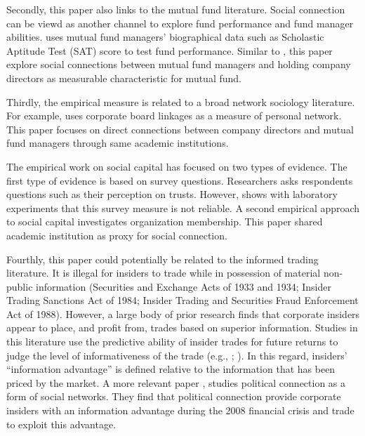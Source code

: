 \documentclass[11pt]{article}
\begin{document}
\begin{doublespace}
Secondly, this paper also links to the mutual fund literature. Social connection can be viewd as another channel to explore fund performance and fund manager abilities. \cite{chevalier1999some} uses mutual fund managers' biographical data such as Scholastic Aptitude Test (SAT) score to test fund performance. Similar to \cite{cohen2008small}, this paper explore social connections between mutual fund managers and holding company directors as measurable characteristic for mutual fund. 

Thirdly, the empirical measure is related to a broad network sociology literature. For example, \cite{useem1984inner} uses corporate board linkages as a measure of personal network. This paper focuses on direct connections between company directors and mutual fund managers through same academic institutions.

The empirical work on social capital has focused on two types of evidence. The first type of evidence is based on survey questions. Researchers asks respondents questions such as their perception on trusts. However, \cite{glaeser2000measuring} shows with laboratory experiments that this survey measure is not reliable. A second empirical approach to social capital investigates organization membership. This paper shared academic institution as proxy for social connection. 

Fourthly, this paper could potentially be related to the informed trading literature. It is illegal for insiders to trade while in possession of material non-public information
(Securities and Exchange Acts of 1933 and 1934; Insider Trading Sanctions Act of 1984; Insider
Trading and Securities Fraud Enforcement Act of 1988). However, a large body of prior
research finds that corporate insiders appear to place, and profit from, trades based on superior
information. Studies in this literature use the predictive ability of insider trades for future returns
to judge the level of informativeness of the trade (e.g., \cite{aboody2000information}; \cite{cohen2012decoding}). In this regard, insiders’
“information advantage” is defined relative to the information that has been priced by the
market. A more relevant paper \cite{jagolinzer2017political}, studies political connection as a form of social networks. They find that political connection provide corporate insiders with an information advantage during the 2008 financial crisis and trade to exploit this advantage. 




\end{doublespace}
\end{document}
